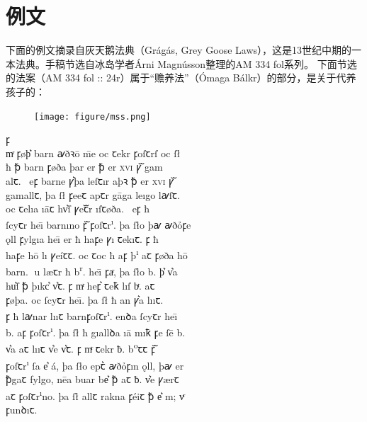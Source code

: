 \section{例文}
下面的例文摘录自灰天鹅法典（Grágás, Grey Goose Laws），这是13世纪中期的一本法典。手稿节选自冰岛学者Árni Magnússon整理的AM 334 fol系列\footnotemark。
下面节选的法案（AM 334 fol :: 24r）属于“赡养法”（Ómaga Bálkr\footnotemark）的部分，是关于代养孩子的：
\begin{multicols}{2}
    \begin{figure}[H]
        \texttt{[image: figure/mss.png]}
    \end{figure}
    \newcolumn
    \quad
    \fontsize{14pt}{14pt}\selectfont
    {\medieval
    \hfill \Eclosedunical ꝼ \\
    \noindent mͬ ꝼøþ͛ barn {\andron ꜹ}ð{\andron ꝛ}\=o \=me oc ꞇekr \vbart ꝼoſꞇrſ oc ſ\l\\
    ħ ꝥ barn ꝼøða þar \vbart er ꝥ er \textsc{xvi} ꝩᷓ gam\\
    alꞇ. \Eunical \nwithdescender \ eꝼ barne ꝩ͛þa leſꞇır aþ{\andron ꝛ} ꝥ er \textsc{xvi} ꝩᷓ\\
    gamallꞇ, þa ſ{\l} ꝼeeꞇ apꞇr g\=aga leıgo l{\andron ꜹ}ſꞇ.\\
    oc ꞇelıa ı\=aꞇ \vbart hv͛ſ ꝩeꞇᷓr ı\nwithdescender ſꞇøða\nwithdescender . \Eclosedunical \nwithdescender \ eꝼ ħ\\
    ſcyꞇr he\=ı barnıno ꝼᷓ ꝼoſꞇr\textsuperscript{ı}. þa {ſ\l}o þ{\andron ꜹ} {\andron ꜹ}ðỏꝼe\\
    \k{o}ll ꝼylgıa he\=ı er ħ haꝼ\dh e ꝩı ꞇekıꞇ. \Eunical ꝼ ħ \\
    haꝼ\dh e h\=o lı{\dh} ꝩe\'{i}ꞇꞇ. oc ꞇoc ħ aꝼ þ\textsuperscript{ı} aꞇ ꝼøða h\=o \\
    barn. {\LARGE }u l\ae ꞇr ħ b\textsuperscript{r}. he\=ı ꝼaͬ, þa {ſ\l}o b. þ͛ v͛\th a\\
    hu͛ſ ꝥ
    þıkc͛ v͛ꞇ. \Eclosedunical ꝼ mͬ heꝼ͛ ꞇeꝁ \vbart lı\dh ſ bͬ. aꞇ \\
    ꝼøþa. oc ſcyꞇr he\=ı. þa {ſ\l} ħ an ꝩ͛a lı\dh ıꞇ.\\
    \Eclosedunical ꝼ ħ l{\andron ꜹ}nar lı\dh ıꞇ barnꝼoſꞇr\textsuperscript{ı}. enꝺa ſcyꞇr he\=ı \\
    b. aꝼ ꝼoſꞇr\textsuperscript{ı}. þa {ſ\l} ħ gıallꝺa ı\=a mıꝁ ꝼe ſ\=e b.\\
    v͛\dh a aꞇ lı\dh ıꞇ v͛e v͛ꞇ. \Eclosedunical ꝼ mͬ ꞇekr ƀ. b\textsuperscript{o}ꞇꞇ ꝼᷓ \\
    ꝼoſꞇr\textsuperscript{ı} ſa e͛ \'{a}, þa {ſ\l}o epꞇ͛ {\andron ꜹ}ðỏꝼın \k{o}ll, þ{\andron ꜹ} er \\
    ꝥgaꞇ fylg\dh o, n\=ea buar be͛ ꝥ aꞇ ƀ. v͛e  ꝩ\ae rꞇ\\
    aꞇ ꝼoſꞇr\textsuperscript{ı}no. þa {ſ\l} allꞇ rakna ꝼ\'{e}iꞇ ꝥ e͛ m; vͬ\\
    ꝼunꝺıꞇ.
    }
\end{multicols}
